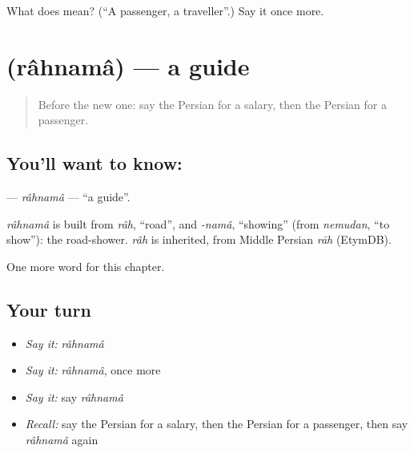 \begin{tcolorbox}[breakable,colback=teal!4,colframe=teal!35!black,title={Before you move on}]
What does  mean? (\textquotedblleft{}A passenger, a traveller\textquotedblright{}.) Say it once more.
\end{tcolorbox}
\section[\texorpdfstring{\fa{راهنما} (râhnamâ)}{راهنما (râhnamâ)}]{ (râhnamâ) — a guide}

\label{lesson:FA-C177-rahnama}



\begin{quote}
Before the new one: say the Persian for a salary, then the Persian for a passenger.
\end{quote}

\subsection*{You'll want to know: }
\textbf{} — \emph{râhnamâ} — \textquotedblleft{}a guide\textquotedblright{}.

\begin{cousinweb}
\emph{râhnamâ} is built from \emph{râh}, \textquotedblleft{}road\textquotedblright{}, and \emph{-namâ}, \textquotedblleft{}showing\textquotedblright{} (from \emph{nemudan}, \textquotedblleft{}to show\textquotedblright{}): the road-shower. \emph{râh} is inherited, from Middle Persian \emph{rāh} (EtymDB).
\end{cousinweb}

\begin{grammarlens}[title={What you've built}]
One more word for this chapter.
\end{grammarlens}

\subsection*{Your turn}
\begin{itemize}
\raggedright
  \item \emph{Say it:} \emph{râhnamâ}
  \item \emph{Say it:} \emph{râhnamâ}, once more
  \item \emph{Say it:} say \emph{râhnamâ}
  \item \emph{Recall:} say the Persian for a salary, then the Persian for a passenger, then say \emph{râhnamâ} again
\end{itemize}

